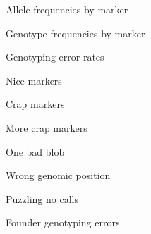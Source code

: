 \documentclass[aspectratio=169,12pt,t]{beamer}
\begin{document}
\begin{frame}[c]{Allele frequencies by marker}

\note{
}
\end{frame}

\begin{frame}[c]{Genotype frequencies by marker}

\note{
}
\end{frame}

\begin{frame}[c]{Genotyping error rates}

\note{
}
\end{frame}

\begin{frame}[c]{Nice markers}

\note{
}
\end{frame}

\begin{frame}[c]{Crap markers}

\note{
}
\end{frame}

\begin{frame}[c]{More crap markers}

\note{
}
\end{frame}

\begin{frame}[c]{One bad blob}

\note{
}
\end{frame}

\begin{frame}[c]{Wrong genomic position}

\note{
}
\end{frame}

\begin{frame}[c]{Puzzling no calls}

\note{
}
\end{frame}



\begin{frame}[c]{}

\centerline{\Large \color{title} Founder genotyping errors}

\note{
}

\end{frame}
\end{document}
